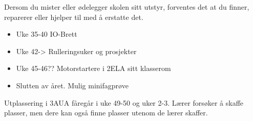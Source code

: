 
%

%

\noindent
{} Dersom du mister eller ødelegger skolen sitt utstyr, forventes det at du finner, reparerer eller hjelper til med å erstatte det. 
\vskip 10pt
\vfil
\noindent
{} 
\begin{itemize}
	\item Uke 35-40 IO-Brett
	\item Uke 42-> Rulleringsuker og prosjekter
	\item Uke 45-46?? Motorstartere i 2ELA sitt klasserom
	\item Slutten av året. Mulig minifagprøve
\end{itemize}
\vskip 10pt
\vfil
\noindent
{} Utplassering i 3AUA fåregår i uke 49-50 og uker 2-3. Lærer forsøker å skaffe plasser, men dere kan også finne plasser utenom de lærer skaffer. 
\vskip 10pt
\vfil


